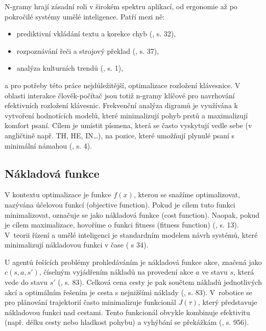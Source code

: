 \documentclass[a4paper, twoside, 12pt, czech]{article}
\begin{document}
N-gramy hrají zásadní roli v širokém spektru aplikací, od ergonomie až po pokročilé
systémy umělé inteligence. Patří mezi ně:
\begin{itemize}
    \item prediktivní vkládání textu a korekce chyb (\cite{textEntrySystems}, s. 32),
    \item rozpoznávání řeči a strojový překlad (\cite{jm3}, s. 37),
    \item analýza kulturních trendů (\cite{gbooksworkflow}, s. 1),
\end{itemize}
a pro potřeby této práce nejdůležitější, optimalizace rozložení klávesnice.
V oblasti interakce člověk-počítač jsou totiž n-gramy klíčové pro navrhování
efektivních rozložení klávesnic. 
Frekvenční analýza digramů je využívána k vytvoření hodnotících modelů, které 
minimalizují pohyb prstů a maximalizují komfort psaní. Cílem je umístit písmena, 
která se často vyskytují vedle sebe (v angličtině např. TH, HE, IN\dots), na 
pozice, které umožňují plynulé psaní s minimální námahou (\cite{engramapproach}, s. 4).

\subsection{Nákladová funkce}
V kontextu optimalizace je funkce $f(x)$, kterou se snažíme optimalizovat, 
nazývána účelovou funkcí (objective function). Pokud je cílem tuto funkci 
minimalizovat, označuje se jako nákladová funkce (cost function). Naopak, 
pokud je cílem maximalizace, hovoříme o funkci fitness (fitness function)
 (\cite{evolutionaryOptimizationAlgos}, s. 13). 
V~teorii řízení a umělé inteligenci je standardním modelem návrh systémů, 
které minimalizují nákladovou funkci v čase (\cite{aiModernApproach} s 34).

U agentů řešících problémy prohledáváním je nákladová funkce akce, značená jako 
$c (s,a,s')$, číselným vyjádřením nákladů na provedení akce $a$ ve stavu $s$, 
která vede do stavu $s'$ (\cite{aiModernApproach}, s. 83). Celková cena cesty je pak součtem nákladů jednotlivých 
akcí a optimálním řešením je cesta s nejnižšími náklady (\cite{aiModernApproach}, s. 83). 
V~robotice se pro plánování trajektorií často minimalizuje funkcionál $J(\tau)$, který představuje 
nákladovou funkci nad cestami. Tento funkcionál obvykle kombinuje efektivitu 
(např. délku cesty nebo hladkost pohybu) a vyhýbání se překážkám (\cite{aiModernApproach}, s. 956).
\end{document}
